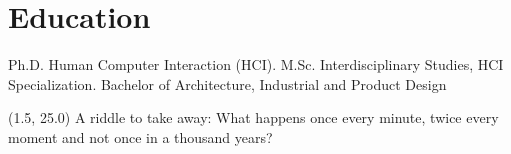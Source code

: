 \documentclass[full]{rvca}
\begin{document}
\section{Education}

Ph.D. Human Computer Interaction (HCI).
M.Sc. Interdisciplinary Studies, HCI Specialization.
Bachelor of Architecture, Industrial and Product Design

\begin{textblock}{3.5}(1.5, 25.0)
\scriptsize \centering A riddle to take away: What happens once every minute, twice every moment and not once in a thousand years?
\end{textblock}
\end{document}
